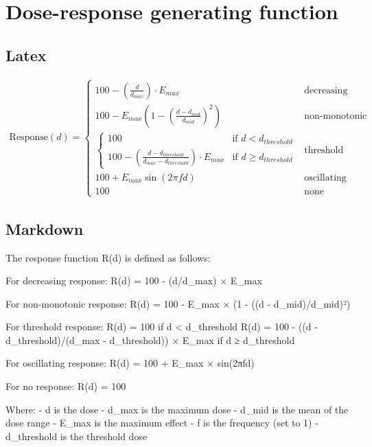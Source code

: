 \documentclass[
]{article}
\author{}
\date{\vspace{-2.5em}}
\begin{document}
\hypertarget{dose-response-generating-function}{%
\section{Dose-response generating
function}\label{dose-response-generating-function}}

\hypertarget{latex}{%
\subsection{Latex}\label{latex}}

\begin{align*}
\text{Response}(d) = \begin{cases}
100 - \left(\frac{d}{d_{max}}\right) \cdot E_{max} & \text{decreasing} \\[2ex]
100 - E_{max}\left(1 - \left(\frac{d - d_{mid}}{d_{mid}}\right)^2\right) & \text{non-monotonic} \\[2ex]
\begin{cases}
100 & \text{if } d < d_{threshold} \\
100 - \left(\frac{d - d_{threshold}}{d_{max} - d_{threshold}}\right) \cdot E_{max} & \text{if } d \geq d_{threshold}
\end{cases} & \text{threshold} \\[2ex]
100 + E_{max}\sin(2\pi f d) & \text{oscillating} \\[2ex]
100 & \text{none}
\end{cases}
\end{align*}

\hypertarget{markdown}{%
\subsection{Markdown}\label{markdown}}

The response function R(d) is defined as follows:

For decreasing response: R(d) = 100 - (d/d\_max) × E\_max

For non-monotonic response: R(d) = 100 - E\_max × (1 - ((d -
d\_mid)/d\_mid)²)

For threshold response: R(d) = 100 if d \textless{} d\_threshold R(d) =
100 - ((d - d\_threshold)/(d\_max - d\_threshold)) × E\_max if d ≥
d\_threshold

For oscillating response: R(d) = 100 + E\_max × sin(2πfd)

For no response: R(d) = 100

Where: - d is the dose - d\_max is the maximum dose - d\_mid is the mean
of the dose range - E\_max is the maximum effect - f is the frequency
(set to 1) - d\_threshold is the threshold dose
\end{document}
